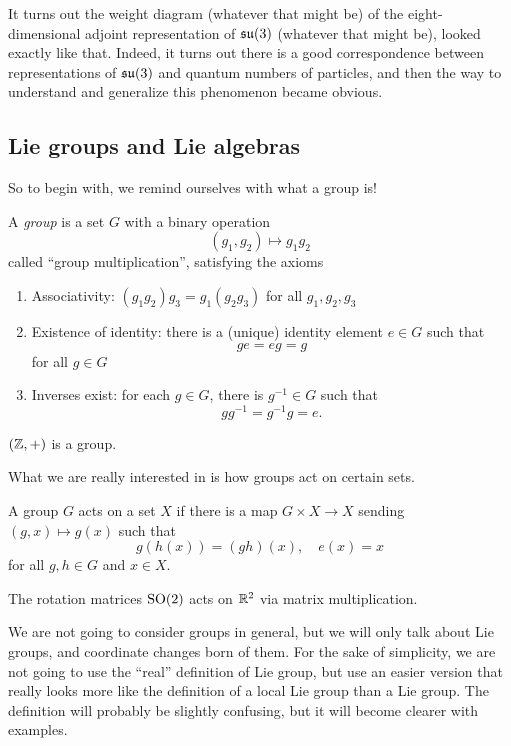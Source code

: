 \documentclass[a4paper]{article}
\begin{document}
It turns out the weight diagram (whatever that might be) of the eight-dimensional adjoint representation of $\mathfrak{su}(3)$ (whatever that might be), looked exactly like that. Indeed, it turns out there is a good correspondence between representations of $\mathfrak{su}(3)$ and quantum numbers of particles, and then the way to understand and generalize this phenomenon became obvious.

\subsection{Lie groups and Lie algebras}
So to begin with, we remind ourselves with what a group is!

\begin{defi}[Group]
  A \emph{group} is a set $G$ with a binary operation
  \[
    (g_1, g_2) \mapsto g_1 g_2
  \]
  called ``group multiplication'', satisfying the axioms
  \begin{enumerate}
    \item Associativity: $(g_1 g_2)g_3 = g_1 (g_2 g_3)$ for all $g_1, g_2, g_3$
    \item Existence of identity: there is a (unique) identity element $e \in G$ such that
      \[
        ge = eg = g
      \]
      for all $g \in G$
    \item Inverses exist: for each $g \in G$, there is $g^{-1} \in G$ such that
      \[
        gg^{-1} = g^{-1}g = e.
      \]
  \end{enumerate}
\end{defi}

\begin{eg}
   $(\mathbb{Z}, +)$ is a group.
\end{eg}

What we are really interested in is how groups act on certain sets.

\begin{defi}
  A group $G$ acts on a set $X$ if there is a map $G \times X \to X$ sending $(g, x) \mapsto g(x)$ such that
  \[
    g(h(x)) = (gh)(x),\quad e(x) = x
  \]
  for all $g, h \in G$ and $x \in X$.
\end{defi}

\begin{eg}
  The rotation matrices $\mathrm{SO}(2)$ acts on $\mathbb{R}^2$ via matrix multiplication.
\end{eg}

We are not going to consider groups in general, but we will only talk about Lie groups, and coordinate changes born of them. For the sake of simplicity, we are not going to use the ``real'' definition of Lie group, but use an easier version that really looks more like the definition of a local Lie group than a Lie group. The definition will probably be slightly confusing, but it will become clearer with examples.
\end{document}
